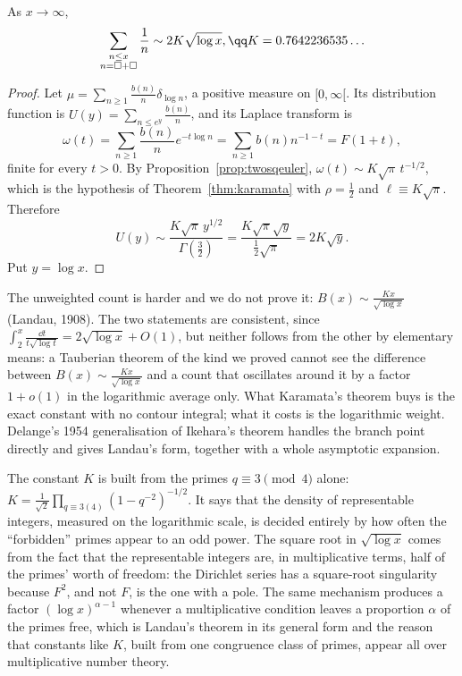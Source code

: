 \begin{theorem}\label{thm:twosqlog}
As $x\to\infty$,
\[
\sum_{\substack{n\le x\\ n=\square+\square}}\frac1n\sim2K\sqrt{\log x},\qq K=0.7642236535\ldots
\]
\end{theorem}
\begin{proof}
Let $\mu=\sum_{n\ge1}\frac{b(n)}n\delta_{\log n}$, a positive measure on $[0,\infty[$. Its distribution function is
$U(y)=\sum_{n\le e^y}\frac{b(n)}n$, and its Laplace transform is
\[
\omega(t)=\sum_{n\ge1}\frac{b(n)}ne^{-t\log n}=\sum_{n\ge1}b(n)n^{-1-t}=F(1+t),
\]
finite for every $t>0$. By Proposition~\ref{prop:twosqeuler}, $\omega(t)\sim K\sqrt\pi\,t^{-1/2}$, which is the hypothesis of Theorem~\ref{thm:karamata} with
$\rho=\frac12$ and $\ell\equiv K\sqrt\pi$. Therefore
\[
U(y)\sim\frac{K\sqrt\pi\,y^{1/2}}{\Gamma(\frac32)}=\frac{K\sqrt\pi\sqrt y}{\frac12\sqrt\pi}=2K\sqrt y.
\]
Put $y=\log x$.
\end{proof}

\begin{remark}
The unweighted count is harder and we do not prove it: $B(x)\sim\frac{Kx}{\sqrt{\log x}}$ (Landau, 1908). The two statements are consistent, since
$\int_2^x\frac{\dd t}{t\sqrt{\log t}}=2\sqrt{\log x}+O(1)$, but neither follows from the other by elementary means: a Tauberian theorem of the kind we proved
cannot see the difference between $B(x)\sim\frac{Kx}{\sqrt{\log x}}$ and a count that oscillates around it by a factor $1+o(1)$ in the logarithmic average
only. What Karamata's theorem buys is the exact constant with no contour integral; what it costs is the logarithmic weight. Delange's 1954 generalisation of
Ikehara's theorem handles the branch point directly and gives Landau's form, together with a whole asymptotic expansion.
\end{remark}

\begin{beauty}
The constant $K$ is built from the primes $q\equiv3\pmod4$ alone: $K=\frac1{\sqrt2}\prod_{q\equiv3(4)}(1-q^{-2})^{-1/2}$. It says that the density of
representable integers, measured on the logarithmic scale, is decided entirely by how often the ``forbidden'' primes appear to an odd power. The square
root in $\sqrt{\log x}$ comes from the fact that the representable integers are, in multiplicative terms, half of the primes' worth of freedom: the
Dirichlet series has a square-root singularity because $F^2$, and not $F$, is the one with a pole. The same mechanism produces a factor $(\log x)^{\alpha-1}$
whenever a multiplicative condition leaves a proportion $\alpha$ of the primes free, which is Landau's theorem in its general form and the reason that
constants like $K$, built from one congruence class of primes, appear all over multiplicative number theory.
\end{beauty}

